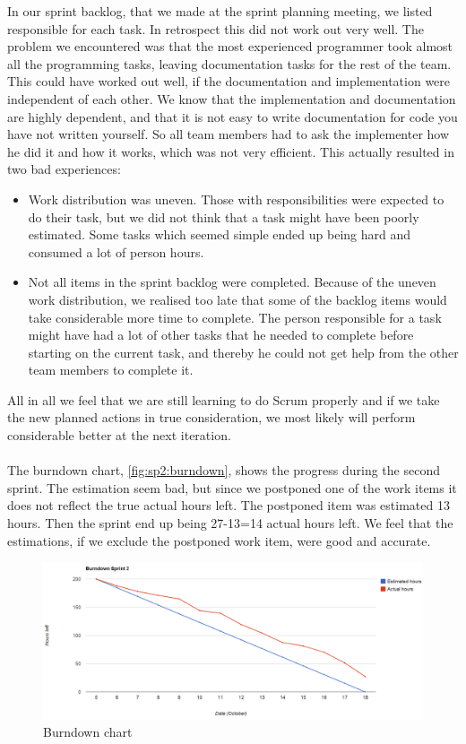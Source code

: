 In our sprint backlog, that we made at the sprint planning meeting, we listed responsible for each task. In retrospect this did not work out very well. The problem we encountered was that the most experienced programmer took almost all the programming tasks, leaving documentation tasks for the rest of the team. This could have worked out well, if the documentation and implementation were independent of each other. We know that the implementation and documentation are highly dependent, and that it is not easy to write documentation for code you have not written yourself. So all team members had to ask the implementer how he did it and how it works, which was not very efficient. 
This actually resulted in two bad experiences:
\begin{itemize}
\item Work distribution was uneven. Those with responsibilities were expected to do their task, but we did not think that a task might have been poorly estimated. Some tasks which seemed simple ended up being hard and consumed a lot of person hours.
\item Not all items in the sprint backlog were completed. Because of the uneven work distribution, we realised too late that some of the backlog items would take considerable more time to complete. The person responsible for a task might have had a lot of other tasks that he needed to complete before starting on the current task, and thereby he could not get help from the other team members to complete it.
\end{itemize} 
 All in all we feel that we are still learning to do Scrum properly and if we take the new planned actions in true consideration, we most likely will perform considerable better at the next iteration. 
\\
\\
The burndown chart, \autoref{fig:sp2:burndown}, shows the progress during the second sprint. The estimation seem bad, but since we postponed one of the work items it does not reflect the true actual hours left. The postponed item was estimated 13 hours. Then the sprint end up being 27-13=14 actual hours left. We feel that the estimations, if we exclude the postponed work item, were good and accurate.
\begin{figure}[!htb]
	\includegraphics[width=\textwidth]{./sprints/img/burndown_chart_s2}
	\caption{Burndown chart\label{fig:sp2:burndown}}
\end{figure}



